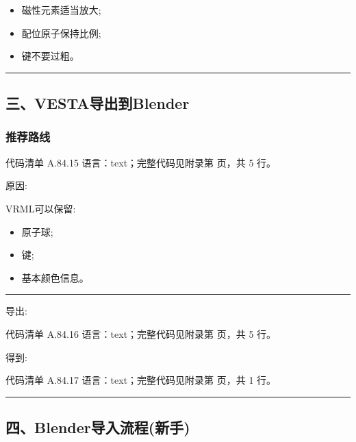 \documentclass[lang=cn,scheme=chinese,color=blue,device=normal,toc=onecol,math=cm]{elegantbook}
\begin{document}
\begin{itemize}
\item 磁性元素适当放大;
\item 配位原子保持比例;
\item 键不要过粗。
\end{itemize}


\medskip\hrule\medskip


\subsection{三、VESTA导出到Blender}


\subsubsection{推荐路线}


\begin{codeindexbox}{代码清单 A.84.15}
语言：text；完整代码见附录第 \pageref{code:84:15} 页，共 5 行。
\end{codeindexbox}


原因:\par


VRML可以保留:\par


\begin{itemize}
\item 原子球;
\item 键;
\item 基本颜色信息。
\end{itemize}


\medskip\hrule\medskip


导出:\par


\begin{codeindexbox}{代码清单 A.84.16}
语言：text；完整代码见附录第 \pageref{code:84:16} 页，共 5 行。
\end{codeindexbox}


得到:\par


\begin{codeindexbox}{代码清单 A.84.17}
语言：text；完整代码见附录第 \pageref{code:84:17} 页，共 1 行。
\end{codeindexbox}


\medskip\hrule\medskip


\subsection{四、Blender导入流程(新手)}
\end{document}
